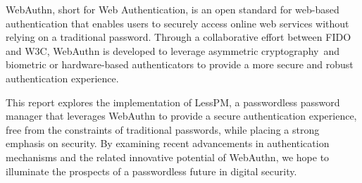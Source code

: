 WebAuthn, short for Web Authentication, is an open standard for web-based
authentication that enables users to securely access online web services without
relying on a traditional password.
Through a collaborative effort between FIDO and W3C, WebAuthn is developed to
leverage asymmetric cryptography\assymetricCrypto\jsonwebLibrary~and biometric
or hardware-based authenticators to provide a more secure and robust
authentication experience.

This report explores the implementation of LessPM, a passwordless password
manager that leverages WebAuthn to provide a secure authentication experience,
free from the constraints of traditional passwords, while placing a strong
emphasis on security.
By examining recent advancements in authentication mechanisms and the related
innovative potential of WebAuthn, we hope to illuminate the prospects of a
passwordless future in digital security.

